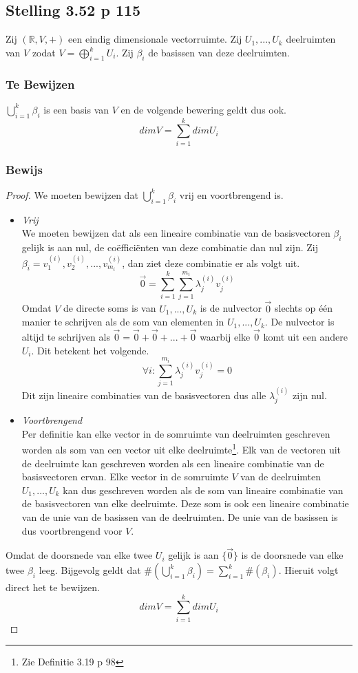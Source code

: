 \documentclass[lineaire_algebra_oplossingen.tex]{subfiles}
\begin{document}
\subsection{Stelling 3.52 p 115}
Zij $(\mathbb{R},V,+)$ een eindig dimensionale vectorruimte. Zij $U_1,...,U_k$ deelruimten van $V$ zodat $V=\bigoplus_{i=1}^kU_i$. Zij $\beta_i$ de basissen van deze deelruimten.
\subsubsection*{Te Bewijzen}
$\bigcup_{i=1}^k\beta_i$ is een basis van $V$ en de volgende bewering geldt dus ook.
\[
dimV = \sum_{i=1}^kdimU_i
\]
\subsubsection*{Bewijs}
\begin{proof}
We moeten bewijzen dat $\bigcup_{i=1}^k\beta_i$ vrij en voortbrengend is.
\begin{itemize}
\item \emph{Vrij}\\
We moeten bewijzen dat als een lineaire combinatie van de basisvectoren $\beta_i$ gelijk is aan nul, de co\"effici\"enten van deze combinatie dan nul zijn. Zij $\beta_i = {v_1^{(i)},v_2^{(i)},...,v_{m_i}^{(i)}}$, dan ziet deze combinatie er als volgt uit.
\[
\vec{0} = \sum_{i=1}^k\sum_{j=1}^{m_i}\lambda_j^{(i)}v_j^{(i)}
\]
Omdat $V$ de directe soms is van $U_1,...,U_k$ is de nulvector $\vec{0}$ slechts op \'e\'en manier te schrijven als de som van elementen in $U_1,...,U_k$. De nulvector is altijd te schrijven als $\vec{0} = \vec{0} + \vec{0} + ... + \vec{0}$ waarbij elke $\vec{0}$ komt uit een andere $U_i$. Dit betekent het volgende.
\[
\forall i: \sum_{j=1}^{m_i}\lambda_j^{(i)}v_j^{(i)} = 0
\]
Dit zijn lineaire combinaties van de basisvectoren dus alle $\lambda_j^{(i)}$ zijn nul.
\item \emph{Voortbrengend}\\
Per definitie kan elke vector in de somruimte van deelruimten geschreven worden als som van een vector uit elke deelruimte\footnote{Zie Definitie 3.19 p 98}.
Elk van de vectoren uit de deelruimte kan geschreven worden als een lineaire combinatie van de basisvectoren ervan. Elke vector in de somruimte $V$ van de deelruimten $U_1,...,U_k$ kan dus geschreven worden als de som van lineaire combinatie van de basisvectoren van elke deelruimte. Deze som is ook een lineaire combinatie van de unie van de basissen van de deelruimten. De unie van de basissen is dus voortbrengend voor $V$.
\end{itemize}
Omdat de doorsnede van elke twee $U_i$ gelijk is aan $\{\vec{0}\}$ is de doorsnede van elke twee $\beta_i$ leeg. Bijgevolg geldt dat $\#(\bigcup_{i=1}^k\beta_i) = \sum_{i=1}^k\#(\beta_i)$. Hieruit volgt direct het te bewijzen.
\[
dimV = \sum_{i=1}^kdimU_i
\]
\end{proof}
\end{document}
